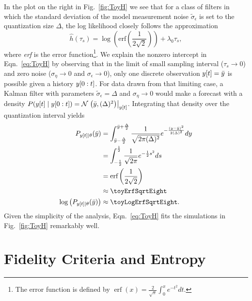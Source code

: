 In the plot on the right in Fig.~\ref{fig:ToyH} we see that for a
class of filters in which the standard deviation of the model
measurement noise $\tilde \sigma_\epsilon$ is set to the quantization
size $\Delta$, the log likelihood closely follows the approximation
\begin{equation}
  \label{eq:ToyH}
  \hat h(\tau_s) = \log\left(\text{erf}\left(\frac{1}{2\sqrt{2}}\right)\right)
  + \lambda_0 \tau_s,
\end{equation}
where \emph{erf} is the error function\footnote{The error function is
  defined by $\operatorname{erf}(x) = \frac{2}{\sqrt{\pi}}\int_0^x
  e^{-t^2} dt$.}.  We explain the nonzero intercept in
Eqn.~\eqref{eq:ToyH} by observing that in the limit of small sampling
interval ($\tau_s \rightarrow 0$) and zero noise ($\sigma_\eta
\rightarrow 0$ and $\sigma_\epsilon \rightarrow 0$), only one discrete
observation ${y}{[t]}=\bar y$ is possible given a history
$y[0:t]$.  For data drawn from that limiting case, a Kalman
filter with parameters $\tilde \sigma_\epsilon = \Delta$ and
$\sigma_\eta \rightarrow 0$ would make a forecast with a density
$P({y}{[t]}\mid y[0:t]) = {\mathcal{N}}\left.\left(\bar
  y,(\Delta)^2\right)\right|_{{y}{[t]}}$.  Integrating that density over the
quantization interval yields
 \begin{align*}
   P_{\ti{y}{t}\given \theta}(\bar y) &= \int_{\bar y -
     \frac{\Delta}{2}}^{\bar y + \frac{\Delta}{2}} \frac{1}{\sqrt{2\pi
       (\Delta)^2}}e^{-\frac{(y-\bar
       y)^2}{2(\Delta)^2}} dy\\
   &= \int_{-\frac{1}{2}}^{\frac{1}{2}} \frac{1}{\sqrt{2\pi
     }}e^{-\frac{1}{2}s^2} ds\\
   &= \text{erf} \left( \frac{1}{2\sqrt{2}}\right) \\
   &\approx \toyErfSqrtEight \\
   \log \left( P_{\ti{y}{t}\given \theta}(\bar y) \right) &\approx \toyLogErfSqrtEight.
 \end{align*}
Given the simplicity of the analysis, Eqn.~\eqref{eq:ToyH} fits the
simulations in Fig.~\ref{fig:ToyH} remarkably well.


\section{Fidelity Criteria and Entropy}
\label{sec:fidelity}

